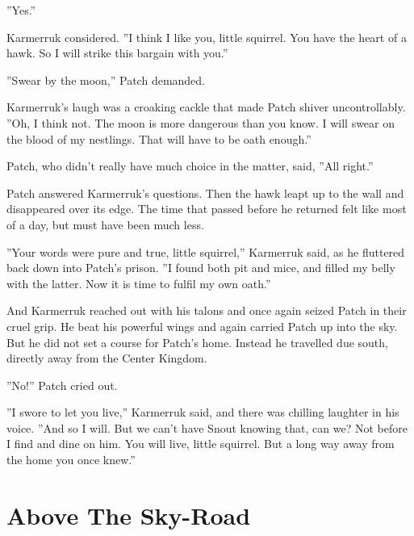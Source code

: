 \documentclass[12pt]{book}
\begin{document}
''Yes.''\par
Karmerruk considered. ''I think I like you, little squirrel. You have the heart of a hawk. So I will strike this bargain with you.''\par
''Swear by the moon,'' Patch demanded.\par
Karmerruk's laugh was a croaking cackle that made Patch shiver uncontrollably. ''Oh, I think not. The moon is more dangerous than you know. I will swear on the blood of my nestlings. That will have to be oath enough.''\par
Patch, who didn't really have much choice in the matter, said, ''All right.''\par
Patch answered Karmerruk's questions. Then the hawk leapt up to the wall and disappeared over its edge. The time that passed before he returned felt like most of a day, but must have been much less.\par
''Your words were pure and true, little squirrel,'' Karmerruk said, as he fluttered back down into Patch's prison. ''I found both pit and mice, and filled my belly with the latter. Now it is time to fulfil my own oath.''\par
And Karmerruk reached out with his talons and once again seized Patch in their cruel grip. He beat his powerful wings and again carried Patch up into the sky. But he did not set a course for Patch's home. Instead he travelled due south, directly away from the Center Kingdom.\par
''No!'' Patch cried out.\par
''I swore to let you live,'' Karmerruk said, and there was chilling laughter in his voice. ''And so I will. But we can't have Snout knowing that, can we? Not before I find and dine on him. You will live, little squirrel. But a long way away from the home you once knew.''\par

\section{Above The Sky-Road}
\end{document}
